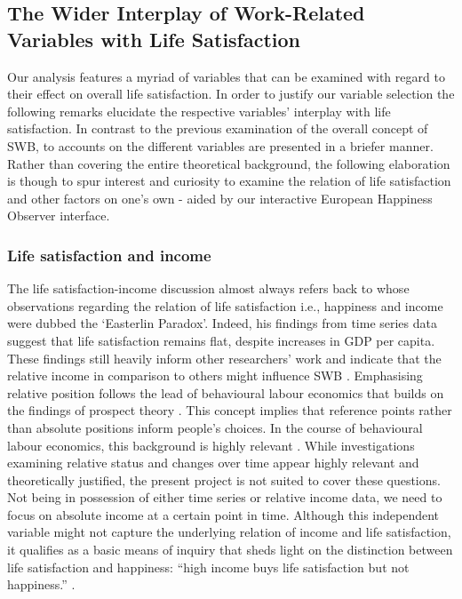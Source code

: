 \documentclass[preprint,12pt,authoryear]{elsarticle}
\begin{document}
	\subsection{The Wider Interplay of Work-Related Variables with Life Satisfaction}
Our analysis features a myriad of variables that can be examined with regard to their effect on overall life satisfaction.
In order to justify our variable selection the following remarks elucidate the respective variables' interplay with life satisfaction.
In contrast to the previous examination of the overall concept of SWB, to accounts on the different variables are presented 
in a briefer manner. Rather than covering the entire theoretical background, the following elaboration is though to spur interest
and curiosity to examine the relation of life satisfaction and other factors on one's own - aided by our interactive 
European Happiness Observer interface. 

\subsubsection{Life satisfaction and income}
The life satisfaction-income discussion almost always refers back to \citet{easterlin_does_1974} whose observations regarding
the relation of life satisfaction i.e., happiness and income were dubbed the `Easterlin Paradox'. Indeed, his findings from time series data
suggest that life satisfaction remains flat, despite increases in GDP per capita. These findings still heavily inform other researchers'
work and indicate that the relative income in comparison to others might influence SWB \citep{di_tella_happiness_2010,drichoutis_reference_2010,pedersen_happiness_2011}.
Emphasising relative position follows the lead of behavioural labour economics that builds on the findings of prospect theory \citep{kahneman_prospect_1979}.
This concept implies that reference points rather than absolute positions inform people's choices. In the course of behavioural
labour economics, this background is highly relevant \citep{dohmen_behavioral_2014}. 
While investigations examining relative status and changes over time appear highly relevant and theoretically justified, the present
project is not suited to cover these questions. Not being in possession of either time series or relative income data, we need
to focus on absolute income at a certain point in time. Although this independent variable might not capture the underlying relation
of income and life satisfaction, it qualifies as a basic means of inquiry that sheds light on the distinction between life satisfaction
and happiness: “high income buys life satisfaction but not happiness.” \citep[p. 16489]{kahneman_high_2010}. 
\end{document}
